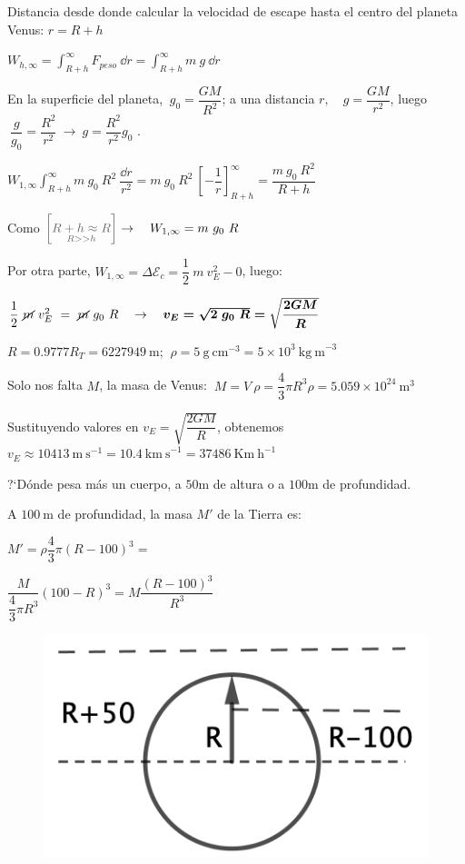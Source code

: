 Distancia desde donde calcular la velocidad de escape hasta el centro del planeta Venus: $r=R+h$

$W_{h,\infty}=\displaystyle \int_{R+h}^\infty F_{peso} \ \dd r = \int_{R+h}^\infty m\ g\ \dd r$

En la superficie del planeta, $\ g_0=\dfrac{GM}{R^2}$; a una distancia $r,\quad g=\dfrac{GM}{r^2}$, luego $\ \dfrac{g}{g_0}=\dfrac{R^2}{r^2}\ \to \ g=\dfrac{R^2}{r^2}g_0$ .

$\displaystyle W_{1,\infty} \int_{R+h}^\infty m\ g_0\ R^2 \ \dfrac{\dd r}{r^2} = m\ g_0 \ R^2 \ {\left[ -\dfrac 1 r\right]}_{R+h}^\infty=\dfrac {m\ g_0\ R^2}{R+h}$

Como $ \textcolor{gris}{\left[ \underset{R>>h}{R+h\approx R} \right]} \to \quad W_{1,\infty}= m\ g_0\ R$

Por otra parte, $W_{1,\infty}=\Delta \mathcal E_c=\dfrac 1 2 \ m \ v_E^2-0$, luego:

$\dfrac 1 2 \ \cancel{m} \ v_E^2 \ = \ \cancel{m} \ g_0\ R \quad \to \quad  \boldsymbol{v_E=\sqrt{2\ g_0\ R}= \sqrt{\dfrac{2GM}{R}}}$

$R=0.9777 R_T=6227949 \ \textrm{m}$; $\ \rho=5\ \mathrm{g\ cm}^{-3}=5 \times 10^{3}\ \mathrm{kg\ m}^{-3}$

Solo nos falta $M$, la masa de Venus: $\ M=V\ \rho = \dfrac 4 3 \pi R^3 \rho= 5.059\times 10^{24}\ \mathrm{m}^3$

Sustituyendo valores en $v_E= \sqrt{\dfrac{2GM}{R}}$, obtenemos \ $v_E\approx 10413 \ \mathrm{m\ s}^{-1}=10.4 \ \mathrm{km\ s}^{-1} = 37486  \ \mathrm{Km\ h}^{-1}$

\begin{prob}
?`Dónde pesa más un cuerpo, a $50 \mathrm{m}$  de altura	 o a $100 \mathrm{m}$ de profundidad.
\end{prob}
\begin{multicols}{2}
A $100 \ \mathrm{m}$ de profundidad, la masa $M'$ de la Tierra es:

\small{$M'=\rho \dfrac 4 3 \pi (R-100)^3=$}

\small{$ \dfrac{M}{\dfrac 4 3 \pi R^3} (100-R)^3= M \dfrac{(R-100)^3}{R^3}$}
\begin{figure}[H]
	\centering
	\includegraphics[width=.35\textwidth]{imagenes/imagenes15/T15IM08.png}
\end{figure}		
\end{multicols}

